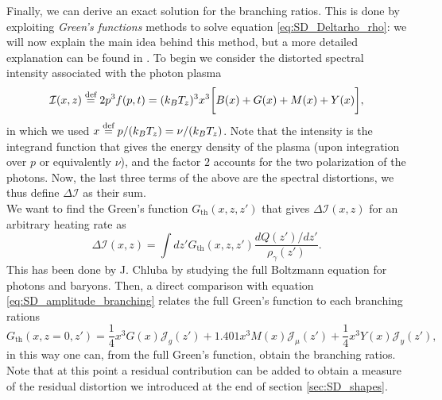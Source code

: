 Finally, we can derive an exact solution for the branching ratios. This is done by exploiting \emph{Green's functions} methods to solve equation \eqref{eq:SD_Deltarho_rho}: we will now explain the main idea behind this method, but a more detailed explanation can be found in \cite{Lucca_2020}. To begin we consider the distorted spectral intensity associated with the photon plasma
$$\mathcal{I}(x,z)\stackrel{\text{def}}{=} 2p^3f(p,t)=(k_BT_z)^3x^3\bigg[B(x)+G(x)+M(x)+Y(x)\bigg],$$
in which we used $x\stackrel{\text{def}}{=} p/(k_BT_z)=\nu/(k_BT_z)$. Note that the intensity is the integrand function that gives the energy density of the plasma (upon integration over $p$ or equivalently $\nu$), and the factor $2$ accounts for the two polarization of the photons.
Now, the last three terms of the above are the spectral distortions, we thus define $\Delta \mathcal{I}$ as their sum.\\
We want to find the Green's function $G_{\text{th}}(x,z,z')$ that gives $\Delta \mathcal{I}(x,z)$ for an arbitrary heating rate as
$$\Delta \mathcal{I}(x,z)=\int dz'G_{\text{th}}(x,z,z')\frac{dQ(z')/dz'}{\rho_\gamma(z')}.$$
This has been done by J. Chluba \cite{Chluba_Green} by studying the full Boltzmann equation for photons and baryons. Then, a direct comparison with equation \eqref{eq:SD_amplitude_branching} relates the full Green's function to each branching rations
$$G_{\text{th}}(x,z=0,z')=\frac{1}{4}x^3G(x)\mathcal{J}_g(z')+1.401x^3M(x)\mathcal{J}_\mu(z')+\frac{1}{4}x^3Y(x)\mathcal{J}_y(z'),$$ in this way one can, from the full Green's function, obtain the branching ratios. Note that at this point a residual contribution can be added to obtain a measure of the residual distortion we introduced at the end of section \ref{sec:SD_shapes}.